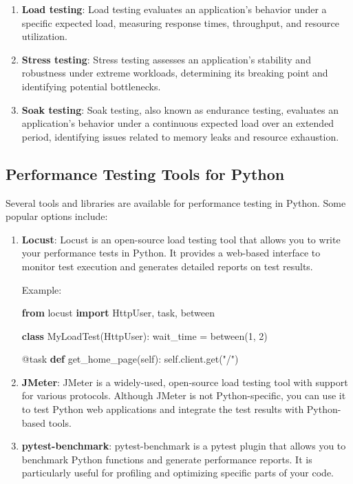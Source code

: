 \documentclass[
  paper=a4,
  ,captions=tableheading
]{scrartcl}
\newenvironment{Shaded}{}{}
\newcommand{\AttributeTok}[1]{\textcolor[rgb]{0.49,0.56,0.16}{#1}}
\newcommand{\DecValTok}[1]{\textcolor[rgb]{0.25,0.63,0.44}{#1}}
\newcommand{\ImportTok}[1]{\textcolor[rgb]{0.00,0.50,0.00}{\textbf{#1}}}
\newcommand{\KeywordTok}[1]{\textcolor[rgb]{0.00,0.44,0.13}{\textbf{#1}}}
\newcommand{\NormalTok}[1]{#1}
\newcommand{\OperatorTok}[1]{\textcolor[rgb]{0.40,0.40,0.40}{#1}}
\newcommand{\StringTok}[1]{\textcolor[rgb]{0.25,0.44,0.63}{#1}}
\newcommand{\VariableTok}[1]{\textcolor[rgb]{0.10,0.09,0.49}{#1}}
\begin{document}
\begin{enumerate}
\def\labelenumi{\arabic{enumi}.}
\item
  \textbf{Load testing}: Load testing evaluates an application's
  behavior under a specific expected load, measuring response times,
  throughput, and resource utilization.
\item
  \textbf{Stress testing}: Stress testing assesses an application's
  stability and robustness under extreme workloads, determining its
  breaking point and identifying potential bottlenecks.
\item
  \textbf{Soak testing}: Soak testing, also known as endurance testing,
  evaluates an application's behavior under a continuous expected load
  over an extended period, identifying issues related to memory leaks
  and resource exhaustion.
\end{enumerate}

\hypertarget{performance-testing-tools-for-python}{%
\subsection{Performance Testing Tools for
Python}\label{performance-testing-tools-for-python}}

Several tools and libraries are available for performance testing in
Python. Some popular options include:

\begin{enumerate}
\def\labelenumi{\arabic{enumi}.}
\item
  \textbf{Locust}: Locust is an open-source load testing tool that
  allows you to write your performance tests in Python. It provides a
  web-based interface to monitor test execution and generates detailed
  reports on test results.

  Example:

\begin{Shaded}
\begin{Highlighting}[]
\ImportTok{from}\NormalTok{ locust }\ImportTok{import}\NormalTok{ HttpUser, task, between}

\KeywordTok{class}\NormalTok{ MyLoadTest(HttpUser):}
\NormalTok{    wait\_time }\OperatorTok{=}\NormalTok{ between(}\DecValTok{1}\NormalTok{, }\DecValTok{2}\NormalTok{)}

    \AttributeTok{@task}
    \KeywordTok{def}\NormalTok{ get\_home\_page(}\VariableTok{self}\NormalTok{):}
        \VariableTok{self}\NormalTok{.client.get(}\StringTok{"/"}\NormalTok{)}
\end{Highlighting}
\end{Shaded}
\item
  \textbf{JMeter}: JMeter is a widely-used, open-source load testing
  tool with support for various protocols. Although JMeter is not
  Python-specific, you can use it to test Python web applications and
  integrate the test results with Python-based tools.
\item
  \textbf{pytest-benchmark}: pytest-benchmark is a pytest plugin that
  allows you to benchmark Python functions and generate performance
  reports. It is particularly useful for profiling and optimizing
  specific parts of your code.
\end{enumerate}
\end{document}
